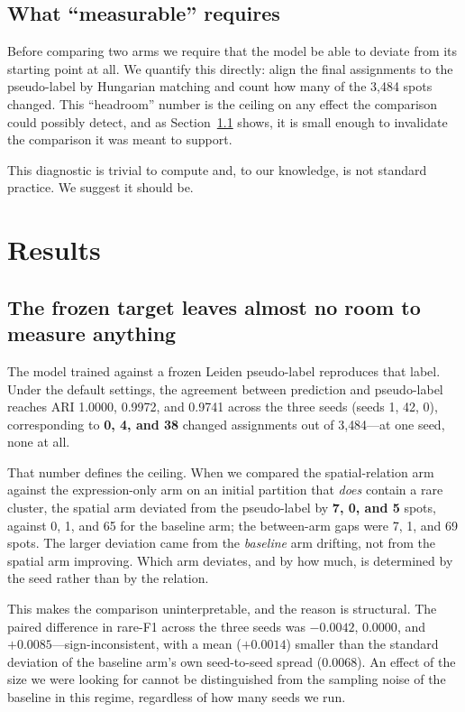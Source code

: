 \documentclass[twocolumn,10pt]{article}
\begin{document}
\subsection{What ``measurable'' requires}

Before comparing two arms we require that the model be able to deviate from its starting point at all. We quantify this directly: align the final assignments to the pseudo-label by Hungarian matching and count how many of the 3{,}484 spots changed. This ``headroom'' number is the ceiling on any effect the comparison could possibly detect, and as Section~\ref{sec:headroom} shows, it is small enough to invalidate the comparison it was meant to support.

This diagnostic is trivial to compute and, to our knowledge, is not standard practice. We suggest it should be.

\section{Results}
\label{sec:results}

\subsection{The frozen target leaves almost no room to measure anything}
\label{sec:headroom}

The model trained against a frozen Leiden pseudo-label reproduces that label. Under the default settings, the agreement between prediction and pseudo-label reaches ARI 1.0000, 0.9972, and 0.9741 across the three seeds (seeds 1, 42, 0), corresponding to \textbf{0, 4, and 38} changed assignments out of 3{,}484---at one seed, none at all.

That number defines the ceiling. When we compared the spatial-relation arm against the expression-only arm on an initial partition that \emph{does} contain a rare cluster, the spatial arm deviated from the pseudo-label by \textbf{7, 0, and 5} spots, against 0, 1, and 65 for the baseline arm; the between-arm gaps were 7, 1, and 69 spots. The larger deviation came from the \emph{baseline} arm drifting, not from the spatial arm improving. Which arm deviates, and by how much, is determined by the seed rather than by the relation.

This makes the comparison uninterpretable, and the reason is structural. The paired difference in rare-F1 across the three seeds was $-0.0042$, $0.0000$, and $+0.0085$---sign-inconsistent, with a mean ($+0.0014$) smaller than the standard deviation of the baseline arm's own seed-to-seed spread ($0.0068$). An effect of the size we were looking for cannot be distinguished from the sampling noise of the baseline in this regime, regardless of how many seeds we run.
\end{document}
